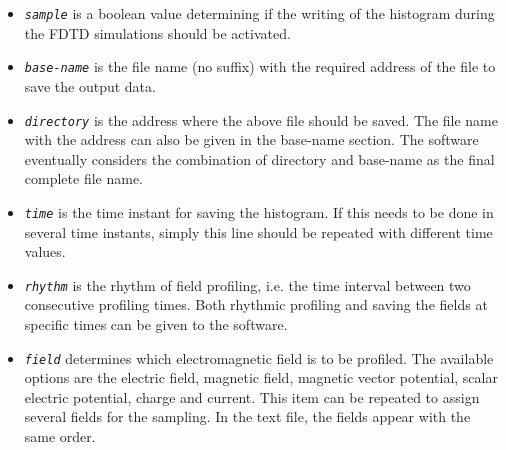 \begin{enumerate}
%
\begin{itemize}
	\item {\tt \small \em sample} is a boolean value determining if the writing of the histogram during the FDTD simulations should be activated.
	\item {\tt \small \em base-name} is the file name (no suffix) with the required address of the file to save the output data.
	\item {\tt \small \em directory} is the address where the above file should be saved. The file name with the address can also be given in the base-name section. The software eventually considers the combination of directory and base-name as the final complete file name.
	\item {\tt \small \em time} is the time instant for saving the histogram. If this needs to be done in several time instants, simply this line should be repeated with different time values.
	\item {\tt \small \em rhythm} is the rhythm of field profiling, i.e. the time interval between two consecutive profiling times. Both rhythmic profiling and saving the fields at specific times can be given to the software.
	\item {\tt \small \em field} determines which electromagnetic field is to be profiled. The available options are the electric field, magnetic field, magnetic vector potential, scalar electric potential, charge and current. This item can be repeated to assign several fields for the sampling. In the text file, the fields appear with the same order.
\end{itemize}
\end{enumerate}

